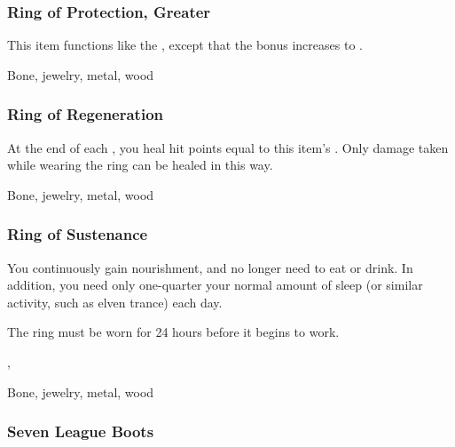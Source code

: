 \lowercase{\hypertarget{item:Ring of Protection, Greater}{}}\label{item:Ring of Protection, Greater}
\hypertarget{item:Ring of Protection, Greater}{\subsubsection{Ring of Protection, Greater\hfill{}}}

This item functions like the , except that the bonus increases to .



 


 Bone, jewelry, metal, wood


\lowercase{\hypertarget{item:Ring of Regeneration}{}}\label{item:Ring of Regeneration}
\hypertarget{item:Ring of Regeneration}{\subsubsection{Ring of Regeneration\hfill{}}}

At the end of each , you heal hit points equal to this item's .
Only damage taken while wearing the ring can be healed in this way.



 


 Bone, jewelry, metal, wood


\lowercase{\hypertarget{item:Ring of Sustenance}{}}\label{item:Ring of Sustenance}
\hypertarget{item:Ring of Sustenance}{\subsubsection{Ring of Sustenance\hfill{}}}

You continuously gain nourishment, and no longer need to eat or drink.
In addition, you need only one-quarter your normal amount of sleep (or similar activity, such as elven trance) each day.

The ring must be worn for 24 hours before it begins to work.



 , 


 Bone, jewelry, metal, wood


\lowercase{\hypertarget{item:Seven League Boots}{}}\label{item:Seven League Boots}
\hypertarget{item:Seven League Boots}{\subsubsection{Seven League Boots\hfill{}}}

